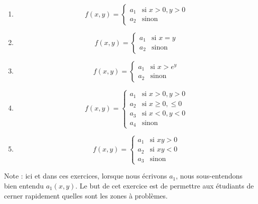 \begin{exercice}
\begin{multicols}{2}
\begin{enumerate}
	\item
	\begin{equation}
		f(x,y)=
		\begin{cases}
			a_1	&	\text{si }x>0,y>0\\
			a_2	&	 \text{sinon}
		\end{cases}
	\end{equation}
	\item
	\begin{equation}
		f(x,y)=
		\begin{cases}
			a_1	&	\text{si }x=y\\
			a_2	&	 \text{sinon}
		\end{cases}
	\end{equation}
	\item
	\begin{equation}
		f(x,y)=
		\begin{cases}
			a_1	&	\text{si }x>e^y\\
			a_2	&	 \text{sinon}
		\end{cases}
	\end{equation}
	\item
	\begin{equation}
		f(x,y)=
		\begin{cases}
			a_1	&	\text{si }x>0,y>0\\
			a_2	&	 \text{si }x\geq 0,\leq 0\\
			a_3	&	 \text{si }x<0,y<0\\
			a_4	&	 \text{sinon}
		\end{cases}
	\end{equation}
	\item
	\begin{equation}
		f(x,y)=
		\begin{cases}
			a_1	&	\text{si }xy>0\\
			a_2	&	 \text{si }xy<0\\
			a_3	&	 \text{sinon}
		\end{cases}
	\end{equation}
\end{enumerate}
\end{multicols}
Note : ici et dans ces exercices, lorsque nous écrivons \og $a_1$\fg, nous sous-entendons bien entendu \og $a_1(x,y)$\fg. Le but de cet exercice est de permettre aux étudiants de cerner rapidement quelles sont les zones à problèmes.

\end{exercice}
